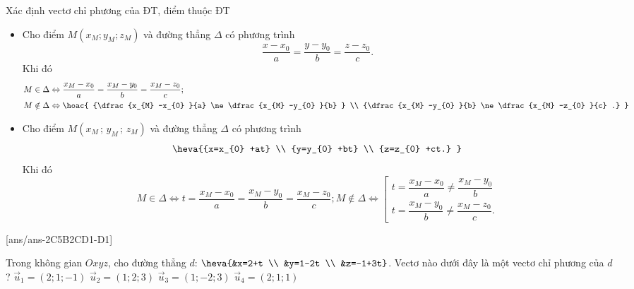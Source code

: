 \begin{dang}{Xác định vectơ chỉ phương của ĐT, điểm thuộc ĐT}
\begin{itemize}
	\item  Cho điểm $M\left(x_{M} ; y_{M} ; z_{M} \right)$ và đường thẳng $\Delta $ có phương trình $$\dfrac{x-x_{0} }{a} =\dfrac{y-y_{0} }{b} =\dfrac{z-z_{0} }{c} .$$ Khi đó
	\begin{align*}
	M\in \Delta & \Leftrightarrow \dfrac{x_{M} -x_{0} }{a} =\dfrac{x_{M} -y_{0} }{b} =\dfrac{x_{M} -z_{0} }{c} ;\\
	 M\notin \Delta &\Leftrightarrow \hoac{ {\dfrac{x_{M} -x_{0} }{a} \ne \dfrac{x_{M} -y_{0} }{b} } \\ {\dfrac{x_{M} -y_{0} }{b} \ne \dfrac{x_{M} -z_{0} }{c} .} }
	\end{align*}
	\item  Cho điểm $M\left(x_{M} \, ;\, y_{M} \, ;\, z_{M} \right)$ và đường thẳng $\Delta $ có phương trình $$\heva{{x=x_{0} +at} \\ {y=y_{0} +bt} \\ {z=z_{0} +ct.} } $$ 
	Khi đó
\[M\in \Delta \Leftrightarrow t=\dfrac{x_{M} -x_{0} }{a} =\dfrac{x_{M} -y_{0} }{b} =\dfrac{x_{M} -z_{0} }{c} ;      M\notin \Delta \Leftrightarrow \left[\begin{array}{l} {t=\dfrac{x_{M} -x_{0} }{a} \ne \dfrac{x_{M} -y_{0} }{b} } \\ {t=\dfrac{x_{M} -y_{0} }{b} \ne \dfrac{x_{M} -z_{0} }{c} .} \end{array}\right. \]
\end{itemize}
\end{dang}
 



\TN
{}[ans/ans-2C5B2CD1-D1]
\begin{ex}%
	Trong không gian $Oxyz$, cho đường thẳng $d$: $\heva{&x=2+t \\ &y=1-2t \\ &z=-1+3t}$. Vectơ nào dưới đây là một vectơ chỉ phương của $d$?
	\choice
		{$\overrightarrow{u}_1=(2;1;-1)$}
		{$\overrightarrow{u}_2=(1;2;3)$}
		{\True $\overrightarrow{u}_3=(1;-2;3)$}
		{$\overrightarrow{u}_4=(2;1;1)$}
\end{ex}

